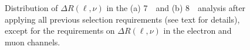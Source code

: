 \begin{figure}[h!bt]\begin{center}
        \caption[bla]{Distribution of $\Delta R(\ell,\nu)$ in the (a) 7~\tev\ and
        (b) 8~\tev\ analysis after applying all previous selection requirements (see text for details),
        except for the requirements on $\Delta R(\ell,\nu)$ in the
        electron and muon channels.
        \label{fig:78tevDRlnu}}
\end{center}\end{figure}
